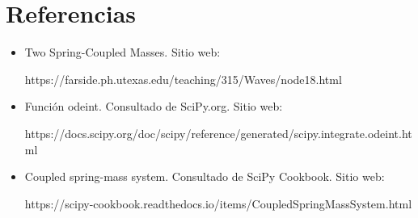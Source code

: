\documentclass{article}
\begin{document}
\section{Referencias}
\begin{itemize}
    \item Two Spring-Coupled Masses. Sitio web:
    
    https://farside.ph.utexas.edu/teaching/315/Waves/node18.html
    
    \item Función odeint. Consultado de SciPy.org. Sitio web:
    
    https://docs.scipy.org/doc/scipy/reference/generated/scipy.integrate.odeint.html
    
    \item Coupled spring-mass system. Consultado de SciPy Cookbook. Sitio web: 
    
    https://scipy-cookbook.readthedocs.io/items/CoupledSpringMassSystem.html
\end{itemize}
\end{document}
